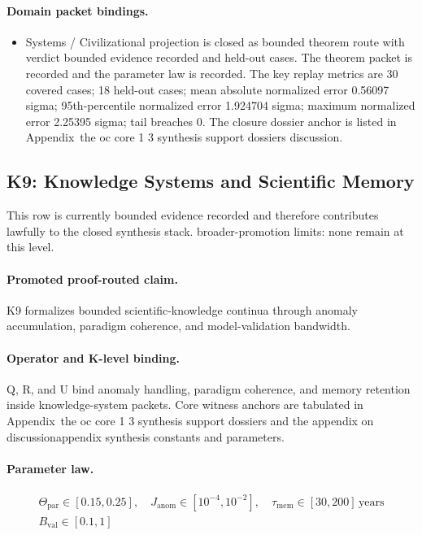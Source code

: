 \paragraph{Domain packet bindings.}
\begin{itemize}[leftmargin=1.6em,nosep]
\item Systems / Civilizational projection is closed as bounded theorem route with verdict bounded evidence recorded and  held-out cases. The theorem packet is recorded and the parameter law is recorded. The key replay metrics are 30 covered cases; 18 held-out cases; mean absolute normalized error 0.56097 sigma; 95th-percentile normalized error 1.924704 sigma; maximum normalized error 2.25395 sigma; tail breaches 0. The closure dossier anchor is listed in Appendix~the oc core 1 3 synthesis support dossiers discussion.
\end{itemize}

\subsection{K9: Knowledge Systems and Scientific Memory}
\label{sec:oc-core-1-3-synthesis-k9}
This row is currently bounded evidence recorded and therefore contributes lawfully to the closed synthesis stack.
broader-promotion limits: none remain at this level.

\paragraph{Promoted proof-routed claim.}
K9 formalizes bounded scientific-knowledge continua through anomaly accumulation, paradigm coherence, and model-validation bandwidth.

\paragraph{Operator and K-level binding.}
Q, R, and U bind anomaly handling, paradigm coherence, and memory retention inside knowledge-system packets.
Core witness anchors are tabulated in Appendix~the oc core 1 3 synthesis support dossiers and the appendix on discussionappendix synthesis constants and parameters.

\paragraph{Parameter law.}
\[
\begin{gathered} \Theta_{\mathrm{par}} \in [0.15,0.25],\quad J_{\mathrm{anom}} \in [10^{-4},10^{-2}],\quad \tau_{\mathrm{mem}} \in [30,200]\,\mathrm{years} \\ B_{\mathrm{val}} \in [0.1,1] \end{gathered}
\]

